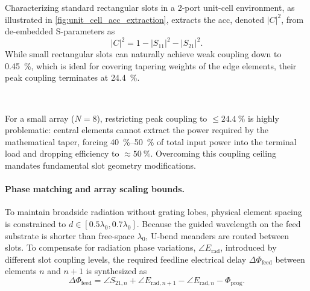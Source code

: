 \noindent
\begin{minipage}[t]{0.44\textwidth}
    \vspace{2ex}
    Characterizing standard rectangular slots in a 2-port unit-cell environment, as illustrated in \cref{fig:unit_cell_acc_extraction}, extracts the \gls{acc}, denoted $|C|^2$, from de-embedded S-parameters as\footnotemark
    \begin{equation}
        \label{eq:acc-extraction}
        |C|^2 = 1 - |S_{11}|^2 - |S_{21}|^2.
    \end{equation}
    While small rectangular slots can naturally achieve weak coupling down to \qty{0.45}{\percent}, which is ideal for covering tapering weights of the edge elements, their peak coupling terminates at \qty{24.4}{\percent}.
\end{minipage}%
\hfill
\begin{minipage}[t]{0.54\textwidth}
    \vspace{0pt}
    \centering
    \resizebox{\linewidth}{!}{}
    \label{fig:unit_cell_acc_extraction}
\end{minipage}\\[1ex]%

\noindent%
For a small array ($N = 8$), restricting peak coupling to $\le \qty{24.4}{\percent}$ is highly problematic: central elements cannot extract the power required by the mathematical taper, forcing \qtyrange{40}{50}{\percent} of total input power into the terminal load and dropping efficiency to $\approx \qty{50}{\percent}$.
Overcoming this coupling ceiling mandates fundamental slot geometry modifications.

\paragraph{Phase matching and array scaling bounds.}
To maintain broadside radiation without grating lobes, physical element spacing is constrained to $d \in [0.5\lambda_0,0.7\lambda_0]$.
Because the guided wavelength on the feed substrate is shorter than free-space $\lambda_0$, U-bend meanders are routed between slots.
To compensate for radiation phase variations, $\angle E_{\mathrm{rad}}$, introduced by different slot coupling levels, the required feedline electrical delay $\Delta\Phi_{\mathrm{feed}}$ between elements $n$ and $n+1$ is synthesized as
\begin{equation}
    \label{eq:phase-matching-feed}
    \Delta\Phi_{\mathrm{feed}} = \angle S_{21,n} + \angle E_{\mathrm{rad},n+1} - \angle E_{\mathrm{rad},n} - \Phi_{\mathrm{prog}}.
\end{equation}


